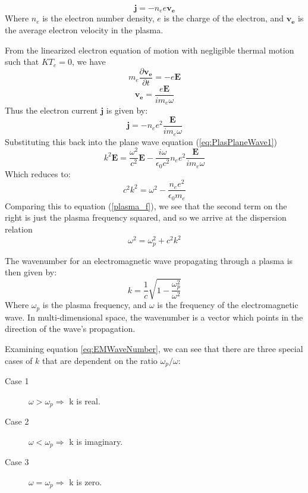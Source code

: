 \documentclass[twocolumn]{article}
\begin{document}
\begin{equation}
	\mathbf{j} = -n_ee\mathbf{v_e}
\end{equation}
Where $n_e$ is the electron number density, $e$ is the charge of the electron, and $\mathbf{v_e}$ is the average electron velocity in the plasma.

From the linearized electron equation of motion with negligible thermal motion such that $KT_e = 0$, we have
\begin{equation}
	m_e\frac{\partial \mathbf{v_e}}{\partial t} = -e\mathbf{E}
\end{equation}
\begin{equation}
	\mathbf{v_e} = \frac{e\mathbf{E}}{im_e\omega}
\end{equation}
Thus the electron current $\mathbf{j}$ is given by:
\begin{equation}
	\mathbf{j} = -n_ee^2\frac{\mathbf{E}}{im_e\omega}
\end{equation}
Substituting this back into the plane wave equation (\ref{eq:PlasPlaneWave1})
\begin{equation}
	k^2\mathbf{E} = \frac{\omega^2}{c^2}\mathbf{E} - \frac{i\omega}{\epsilon_0 c^2}n_ee^2\frac{\mathbf{E}}{im_e\omega}
\end{equation}
Which reduces to:
\begin{equation*}
	c^2k^2 = \omega^2 - \frac{n_ee^2}{\epsilon_0m_e}
\end{equation*}
Comparing this to equation (\ref{plasma_f}), we see that the second term on the right is just the plasma frequency squared, and so we arrive at the dispersion relation
\begin{equation}
	\omega^2 = \omega^2_p + c^2k^2
\end{equation}

The wavenumber for an electromagnetic wave propagating through a plasma is then given by:
\begin{equation}
	\label{eq:EMWaveNumber}
	k = \frac{1}{c}\sqrt{1-\frac{\omega^2_p}{\omega^2}}	
\end{equation}
Where $\omega_p$ is the plasma frequency, and $\omega$ is the frequency of the electromagnetic wave.
In multi-dimensional space, the wavenumber is a vector which points in the direction of the wave's propagation.

Examining equation \ref{eq:EMWaveNumber}, we can see that there are three special cases of $k$ that are dependent on the ratio $\omega_p/\omega$:
\begin{description}
	\item [Case 1]$\omega > \omega_p \Rightarrow$ k is real.
	\item [Case 2]$\omega < \omega_p \Rightarrow$ k is imaginary.
	\item [Case 3]$\omega = \omega_p \Rightarrow$ k is zero.
\end{description}
\end{document}
